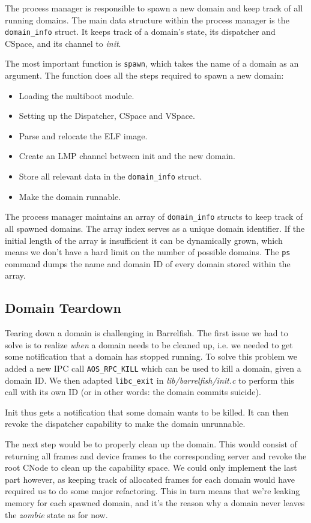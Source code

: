 \documentclass[a4paper,10pt]{article}
\newcommand{\filepath}[1]{\emph{ #1}}
\begin{document}
The process manager is responsible to spawn a new domain and keep track of all running domains.
The main data structure within the process manager is the \lstinline!domain_info! struct.
It keeps track of a domain's state, its dispatcher and CSpace, and its channel to \emph{init}.

The most important function is \lstinline!spawn!, which takes the name of a domain as an argument.
The function does all the steps required to spawn a new domain:
\begin{itemize}
 \item Loading the multiboot module.
 \item Setting up the Dispatcher, CSpace and VSpace.
 \item Parse and relocate the ELF image.
 \item Create an LMP channel between init and the new domain.
 \item Store all relevant data in the \lstinline!domain_info! struct.
 \item Make the domain runnable.
\end{itemize}

The process manager maintains an array of \lstinline!domain_info! structs to keep track of all spawned domains.
The array index serves as a unique domain identifier.
If the initial length of the array is insufficient it can be dynamically grown, which means we don't have a hard limit on the number of possible domains.
The \lstinline!ps! command dumps the name and domain ID of every domain stored within the array.

\subsection {Domain Teardown}

Tearing down a domain is challenging in Barrelfish.
The first issue we had to solve is to realize \emph{when} a domain needs to be cleaned up, i.e. we needed to get some notification that a domain has stopped running.
To solve this problem we added a new IPC call \lstinline!AOS_RPC_KILL! which can be used to kill a domain, given a domain ID.
We then adapted \lstinline!libc_exit! in \filepath{lib/barrelfish/init.c} to perform this call with its own ID (or in other words: the domain commits suicide).

Init thus gets a notification that some domain wants to be killed.
It can then revoke the dispatcher capability to make the domain unrunnable.

The next step would be to properly clean up the domain.
This would consist of returning all frames and device frames to the corresponding server and revoke the root CNode to clean up the capability space.
We could only implement the last part however, as keeping track of allocated frames for each domain would have required us to do some major refactoring.
This in turn means that we're leaking memory for each spawned domain, and it's the reason why a domain never leaves the \emph{zombie} state as for now.
\end{document}
